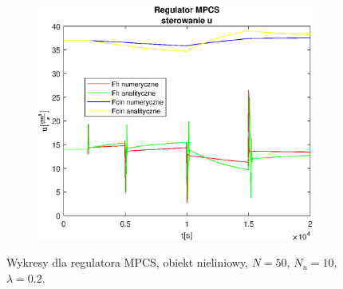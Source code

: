 \begin{figure}[h!]
   \begin{subfigure}[b]{0.4\textwidth}
      \includegraphics[width=1\linewidth]{img/MPCSnumRK/MPCSRKControlN50Nu10l20.eps}
      \caption{}
      \label{fig:fig:MPCSRKN50Nu10l203}
   \end{subfigure}
       
   \caption{Wykresy dla regulatora MPCS, obiekt nieliniowy, $N = 50$, $N_u = 10$, $\lambda = 0.2$.}
   \label{fig:MPCSRKN50Nu10l20}
\end{figure}
           

